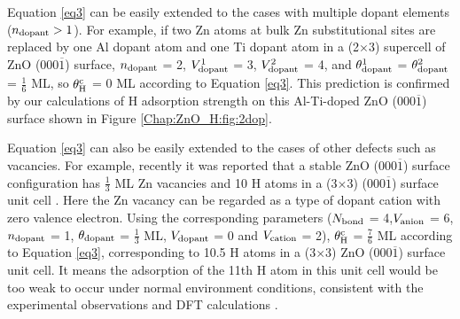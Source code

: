 Equation \ref{eq3} can be easily extended to the cases with multiple dopant elements ($n_{\textup{dopant}} > 1$). For example, if two Zn atoms at bulk Zn substitutional sites are replaced by one Al dopant atom and one Ti dopant atom in a (2$\times$3) supercell of ZnO (000$\overline{1}$) surface, $n_{\textup{dopant}}$ = 2,  $V_{\textup{dopant}}^1$ = 3, $V_{\textup{dopant}}^2$ = 4, and $\theta_{\textup{dopant}}^1$ = $\theta_{\textup{dopant}}^2$ = $\frac{1}{6}$ ML,  so $\theta_{\textup{H}}^{\textup{c}}$ = 0 ML according to Equation \ref{eq3}. This prediction is confirmed by our calculations of H adsorption strength on this Al-Ti-doped ZnO (000$\overline{1}$) surface shown in Figure \ref{Chap:ZnO_H:fig:2dop}. 

Equation \ref{eq3} can also be easily extended to the cases of other defects such as vacancies. For example, recently it was reported that a stable ZnO (000$\overline{1}$) surface configuration has $\frac{1}{3}$ ML Zn vacancies and 10 H atoms in a (3$\times$3) (000$\overline{1}$) surface unit cell \cite{Jacobs16ZnO}. Here the Zn vacancy can be regarded as a type of dopant cation with zero valence electron. Using the corresponding parameters ($N_{\textup{bond}}$ = 4,$V_{\textup{anion}}$ = 6, $n_{\textup{dopant}}$ = 1, $\theta_{\textup{dopant}}$ = $\frac{1}{3}$ ML, $V_{\textup{dopant}}$ = 0 and $V_{\textup{cation}}$ = 2), $\theta_{\textup{H}}^{\textup{c}}$ = $\frac{7}{6}$ ML according to Equation \ref{eq3}, corresponding to 10.5 H atoms in a (3$\times$3) ZnO (000$\overline{1}$) surface unit cell. It means the adsorption of the 11th H atom in this unit cell would be too weak to occur under normal environment conditions, consistent with the experimental observations and \ac{DFT} calculations \cite{Jacobs16ZnO}.

